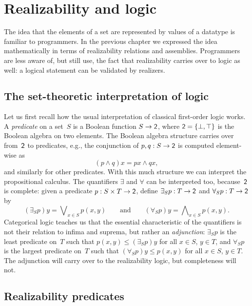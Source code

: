 \chapter{Realizability and logic}
\label{sec:realizability-interpretation}

The idea that the elements of a set are represented by values of a datatype is familiar to programmers. In the previous chapter we expressed the idea mathematically in terms of realizability relations and assemblies. Programmers are less aware of, but still use, the fact that realizability carries over to logic as well: a logical statement can be validated by realizers.

\section{The set-theoretic interpretation of logic}
\label{sec:interpr-logic-set-theoretic}

Let us first recall how the usual interpretation of classical
first-order logic works.
%
A \emph{predicate} on a set~$S$ is a Boolean function $S \to \mathsf{2}$, where $\mathsf{2} = \{\bot, \top\}$ is the Boolean algebra on two elements. The Boolean algebra structure carries over from~$\mathsf{2}$ to predicates, e.g., the conjunction of $p, q : S \to \mathsf{2}$ is computed element-wise as
%
\begin{equation*}
  (p \land q) x = p x \land q x,
\end{equation*}
%
and similarly for other predicates. With this much structure we can interpret the propositional calculus. The quantifiers $\exists$ and $\forall$ can be interpreted too, because~$\mathsf{2}$ is complete: given a predicate $p : S \times T \to \mathsf{2}$, define $\exists_S p : T \to \mathsf{2}$ and $\forall_S p : T \to \mathsf{2}$ by
%
\begin{equation*}
  (\exists_S p) y = \bigvee\nolimits_{x \in S} p(x, y)
  \qquad\text{and}\qquad
  (\forall_S p) y = \bigwedge\nolimits_{x \in S} p(x, y).
\end{equation*}
%
Categorical logic teaches us that the essential characteristic of the quantifiers is not their relation to infima and suprema, but rather an \emph{adjunction}: $\exists_S p$ is the least predicate on~$T$ such that $p(x, y) \leq (\exists_S p) y$ for all $x \in S$, $y \in T$, and $\forall_S p$ is the largest predicate on~$T$ such that $(\forall_S p) y \leq p(x, y)$ for all $x \in S$, $y \in T$. The adjunction will carry over to the realizability logic, but completeness will not.


\section{Realizability predicates}
\label{sec:realizability-predicates}

